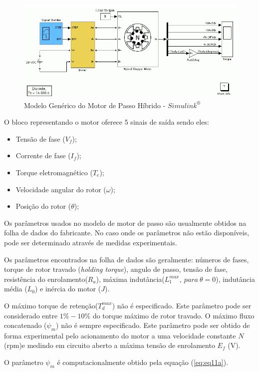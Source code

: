 \begin{figure}[H]
	\centering
	\includegraphics[scale=.42]{Images/modeloEE_HSM.PNG}
	\caption{ Modelo Genérico do Motor de Passo Híbrido - $Simulink^{\circledR}$ }
	\label{fig:fig2}
\end{figure}

O bloco representando o motor oferece 5 sinais de saída sendo eles:

\begin{itemize}
	\item Tensão de fase ($V_f$);
	\item Corrente de fase ($I_f$);
	\item Torque eletromagnético ($T_e$);
	\item Velocidade angular do rotor ($\omega$);
	\item Posição do rotor ($\theta$);
\end{itemize}

Os parâmetros usados no modelo de motor de passo são usualmente obtidos na folha de dados do fabricante. No caso onde os parâmetros não estão disponíveis, pode ser determinado através de medidas experimentais.

Os parâmetros encontrados na folha de dados são geralmente: números de fases, torque de rotor travado (\textit{holding torque}), angulo de passo, tensão de fase, resistência do enrolamento($R_a$), máxima indutância($L_1^{max},\ para\ \theta=0$), indutância média ($L_0$) e inércia do motor ($J$).

O máximo torque de retenção($T_d^{max}$) não é especificado. Este parâmetro pode  ser considerado entre $1\%-10\%$ do torque máximo de rotor travado. O máximo fluxo concatenado ($\psi_m$) não é sempre especificado. Este parâmetro pode ser obtido de forma experimental pelo acionamento do motor a uma velocidade constante $N$ (rpm)e medindo em circuito aberto a máxima tensão de enrolamento $E_f$ (V).

O parâmetro $\psi_m$ é computacionalmente obtido pela equação (\ref{eq:eq11a}).

